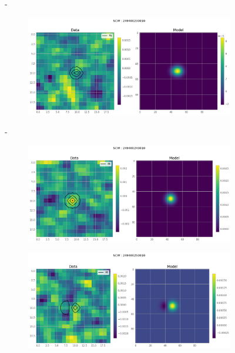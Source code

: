 \documentclass[
	a4paper, %
	10pt, %
	unnumberedsections, %
	twoside, %
]{LTJournalArticle}
\begin{document}
\begin{figure}[H]
\begin{subfigure}{.47\textwidth}
    \end{subfigure}
    \hspace{1em}-
    \begin{subfigure}{.47\textwidth}
        \includegraphics[width=\textwidth]{report/Figures/models/2204/23_psf_notconst.png}
    \end{subfigure}%
    \hspace{1em}-
    \begin{subfigure}{.47\textwidth}
        \centering
        \includegraphics[width=\textwidth]{report/Figures/models/2204/24_psf_notconst.png}
    \end{subfigure}
    \begin{subfigure}{.47\textwidth}
        \centering
        \includegraphics[width=\textwidth]{report/Figures/models/2204/25_psf_notconst.png}

\end{subfigure}
\end{figure}
\end{document}
